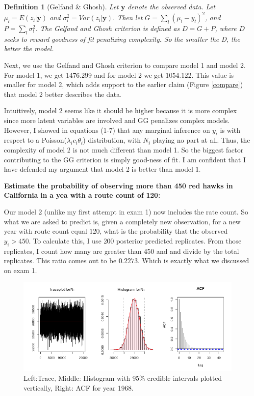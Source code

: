 \documentclass{asaproc}
\newtheorem{defn}{Definition}
\newcommand{\yi}{y_i}
\newcommand{\lami}{\lambda_i}
\newcommand{\theti}{\theta_i}
\newcommand{\ci}{c_i}
\newcommand{\Ni}{N_i}
\begin{document}
\begin{defn}[Gelfand \& Ghosh]
Let $\pmb{y}$ denote the observed data. Let $\mu_l = E(z_l|\pmb{y})$ and $\sigma^2_l = Var(z_l|\pmb{y})$. Then let $G = \sum_l (\mu_l - y_l)^2$, and $P = \sum_l \sigma^2_l$. The Gelfand and Ghosh criterion is defined as $D = G + P$, where $D$ seeks to reward goodness of fit penalizing complexity. So the smaller the D, the better the model.
\label{GG}
\end{defn}

Next, we use the Gelfand and Ghosh criterion to compare model 1 and model 2. For model 1, we get 1476.299 and for model 2 we get 1054.122. This value is smaller for model 2, which adds support to the earlier claim (Figure \ref{compare}) that model 2 better describes the data.

Intuitively, model 2 seems like it should be higher because it is more complex since more latent variables are involved and GG penalizes complex models. However, I showed in equations (1-7) that any marginal inference on $y_i$ is with respect to a Poisson($\lami\ci\theti$) distribution, with $\Ni$ playing no part at all. Thus, the complexity of model 2 is not much different than model 1. So the biggest factor contributing to the GG criterion is simply good-ness of fit. I am confident that I have defended my argument that model 2 is better than model 1.

\textbf{Estimate the probability of observing more than 450 red hawks in California in a yea with a route count of 120:}

Our model 2 (unlike my first attempt in exam 1) now includes the rate count. So what we are asked to predict is, given a completely new observation, for a new year with route count equal 120, what is the probability that the observed $\yi>450$. To calculate this, I use 200 posterior predicted replicates. From those replicates, I count how many are greater than 450 and and divide by the total replicates. This ratio comes out to be $0.2273$. Which is exactly what we discussed on exam 1.

\begin{figure}[h!]
    \centering
    \includegraphics[scale=0.6]{N1_trace.png}
    \caption{Left:Trace, Middle: Histogram with 95\% credible intervals plotted vertically, Right: ACF for year 1968.}
    \label{append1}
\end{figure}
\end{document}
